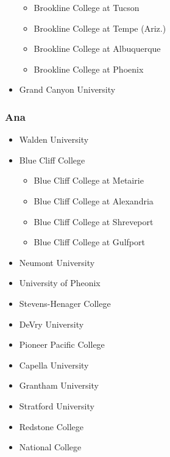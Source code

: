 \documentclass[
]{article}
\providecommand{\tightlist}{%
  \setlength{\itemsep}{0pt}\setlength{\parskip}{0pt}}
\begin{document}
\begin{itemize}
  \begin{itemize}
  \tightlist
  \item
    Brookline College at Tucson
  \item
    Brookline College at Tempe (Ariz.)
  \item
    Brookline College at Albuquerque
  \item
    Brookline College at Phoenix
  \end{itemize}
\item
  Grand Canyon University
\end{itemize}

\hypertarget{ana}{%
\subsubsection{Ana}\label{ana}}

\begin{itemize}
\tightlist
\item
  Walden University
\item
  Blue Cliff College

  \begin{itemize}
  \tightlist
  \item
    Blue Cliff College at Metairie
  \item
    Blue Cliff College at Alexandria
  \item
    Blue Cliff College at Shreveport
  \item
    Blue Cliff College at Gulfport
  \end{itemize}
\item
  Neumont University\\
\item
  University of Pheonix
\item
  Stevens-Henager College\\
\item
  DeVry University\\
\item
  Pioneer Pacific College\\
\item
  Capella University\\
\item
  Grantham University\\
\item
  Stratford University\\
\item
  Redstone College\\
\item
  National College
\end{itemize}
\end{document}
